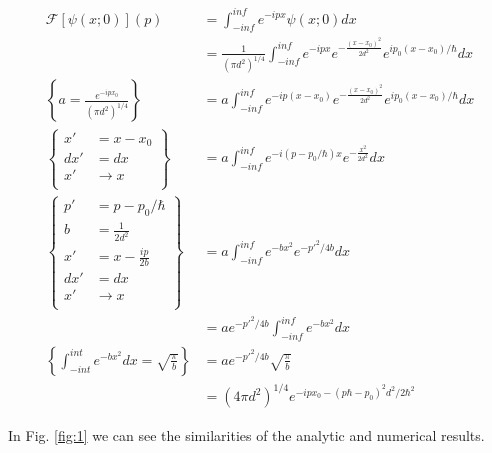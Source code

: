\begin{equation}
\begin{split}
	\mathcal{F}\left[\psi(x;0)\right](p) 							& =  \int_{-inf}^{inf} e^{-ipx} \psi(x;0) dx \\
 																	& = \frac{1}{(\pi d^2)^{1/4}}\int_{-inf}^{inf}e^{-ipx}e^{-\frac{(x-x_0)^2}{2d^2}} e^{ip_0(x-x_0)/\hbar}dx\\
\left\{a=\frac{e^{-ipx_0}}{(\pi d^2)^{1/4}}\right\}					& = a \int_{-inf}^{inf}e^{-ip(x-x_0)}e^{-\frac{(x-x_0)^2}{2d^2}}e^{ip_0(x-x_0)/\hbar} dx\\
\left\{
\begin{array}{ll}
x'	& = x-x_0\\
dx' & = dx   \\
x'	& \rightarrow x\\
\end{array}
\right\} 															& = a\int_{-inf}^{inf}e^{-i(p-p_0/\hbar)x}e^{-\frac{x^2}{2d^2}}dx \\
\left\{
\begin{array}{ll}
p'		& = p-p_0/\hbar\\
b		& = \frac{1}{2d^2}   \\
x'		& = x-\frac{ip}{2b}\\
dx'		& = dx\\
x'		& \rightarrow x\\
\end{array}
\right\}															& = a\int_{-inf}^{inf}e^{-bx^2}e^{-p'^2/4b} dx\\
																	& = ae^{-p'^2/4b}\int_{-inf}^{inf}e^{-bx^2} dx\\
\left\{\int_{-int}^{int}e^{-bx^2}dx=\sqrt{\frac{\pi}{b}}\right\}	& = ae^{-p'^2/4b}\sqrt{\frac{\pi}{b}}\\
																	& = (4\pi d^2)^{1/4}e^{-ipx_0-(p\hbar-p_0)^2d^2/2\hbar^2}
\end{split}
\end{equation}

In Fig. \ref{fig:1} we can see the similarities of the analytic and numerical results.

